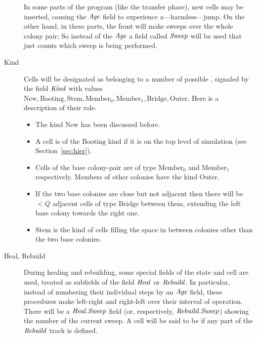 \documentclass[11pt]{memoir}
\theoremstyle{definition} %
\newcommand{\fld}[1]{\ensuremath{\textit{#1\/}}}
\newcommand{\Q}{Q} %
\newcommand{\Age}{\fld{Age}} %
\newcommand{\Heal}{\fld{Heal}} %
\newcommand{\Kind}{\fld{Kind}}
\newcommand{\Rebuild}{\fld{Rebuild}} %
\newcommand{\Sweep}{\fld{Sweep}} %
\newcommand{\New}{\mathrm{New}}
\newcommand{\Stem}{\mathrm{Stem}}
\newcommand{\Booting}{\mathrm{Booting}}
\newcommand{\Bridge}{\mathrm{Bridge}}
\newcommand{\Member}{\mathrm{Member}}
\newcommand{\Outer}{\mathrm{Outer}}
\begin{document}
\begin{description}
  In some parts of the program (like the transfer phase),
  new cells may be inserted, causing the \( \Age \) field to experience a---harmless---jump.
  On the other hand, in these parts, the front will make sweeps over the whole colony pair;
  So instead of the \( \Age \) a field called \( \Sweep \) will be used that just counts
  which sweep is being performed.

\item[Kind] Cells will be designated as belonging to a number of
  possible , signaled by the field \( \Kind \)
with values \(  \New, \Booting, \Stem, \Member_{0},\Member_{1},\Bridge, \Outer \).
Here is a description of their role.
\begin{itemize}
\item The kind \( \New \) has been discussed before.
\item A cell is of the \( \Booting \) kind if it is on the top level of simulation (see Section~\ref{sec:hier}).

\item Cells of the base colony-pair are of type \( \Member_{0} \) and \( \Member_{1} \) respectively.
  Members of other colonies have the kind \( \Outer \).

\item If the two base colonies are close but not adjacent then there will be \( <\Q \)
  adjacent cells of type \( \Bridge \) between them, extending the left
  base colony towards the right one.

\item \( \Stem \) is the kind of cells filling the space in between colonies other than the two base colonies.
\end{itemize}

\item[Heal, Rebuild] During healing and rebuilding, some special fields of the state and cell are used,
  treated as subfields of the field \( \Heal \) or \( \Rebuild \).
  In particular, instead of numbering their individual steps by an \( \Age \) field,
  these procedures make left-right and right-left  over their interval of operation.
  There will be a \( \Heal.\Sweep \) field (or, respectively, \( \Rebuild.\Sweep \))
  showing the number of the current sweep.
  A cell will be said to be  if any part of the \( \Rebuild \) track is defined.

\end{description}
\end{document}
